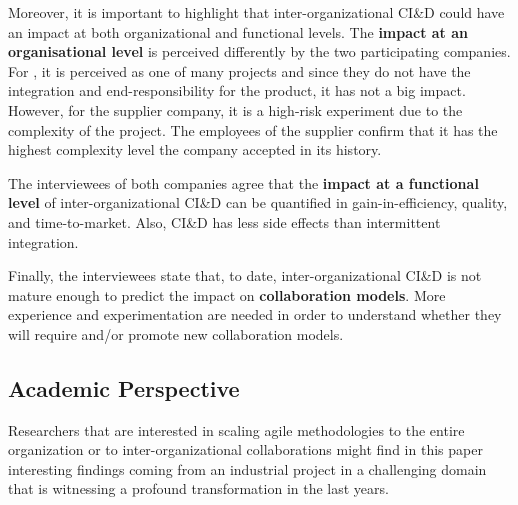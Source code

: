 Moreover, it is important to highlight that inter-orga\-ni\-za\-tional CI\&D could have an impact at both organizational and functional levels. 
%
%
The {\bf impact at an organisational level} is perceived differently by the two participating companies. For \company{}, it is perceived as one of  many projects and since they do not have the integration and end-responsibility for the product, it has not a big impact. However, for the supplier company, it is a high-risk experiment due to the complexity of the project. The employees of the supplier confirm that it has the highest complexity level the company accepted in its history.

The interviewees of both companies agree that the {\bf impact at a functional level} of inter-organizational CI\&D %
can be quantified in gain-in-efficiency, quality, and time-to-market. Also, CI\&D has less side effects than intermittent integration.%



Finally, the interviewees state that, to date, inter-organizational CI\&D is not mature enough to predict the impact on {\bf collaboration models}. More experience and experimentation are needed in order to understand whether they will require and/or promote new collaboration models.

\subsection{Academic Perspective}\label{sec:research}


Researchers that are interested in scaling agile methodologies to the entire organization or to inter-organizational collaborations might find in this paper interesting findings coming from an industrial project in a challenging domain that is witnessing a profound transformation in the last years. 

